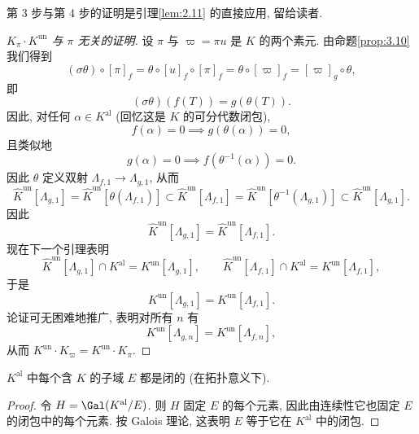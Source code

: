 第 3 步与第 4 步的证明是引理\ref{lem:2.11} 的直接应用, 留给读者.

\begin{proof}[$K_{\pi}\cdot K^{\mathrm{un}}$ 与 $\pi$ 无关的证明]
设 $\pi$ 与 $\varpi=\pi u$ 是 $K$ 的两个素元. 由命题\ref{prop:3.10} 我们得到
\[
(\sigma\theta)\circ[\pi]_f=\theta\circ[u]_f\circ[\pi]_f=\theta\circ[\varpi]_f=[\varpi]_g\circ\theta,
\]
即
\[
(\sigma\theta)(f(T))=g(\theta(T)).
\]
因此, 对任何 $\alpha\in K^{\mathrm{al}}$ (回忆这是 $K$ 的可分代数闭包),
\[
f(\alpha)=0\implies g(\theta(\alpha))=0,
\]
且类似地
\[
g(\alpha)=0\implies f(\theta^{-1}(\alpha))=0.
\]
因此 $\theta$ 定义双射 $\Lambda_{f,1}\to\Lambda_{g,1}$, 从而
\[
\hat{K}^{\mathrm{un}}[\Lambda_{g,1}]=\hat{K}^{\mathrm{un}}[\theta(\Lambda_{f,1})]\subset\hat{K}^{\mathrm{un}}[\Lambda_{f,1}]=\hat{K}^{\mathrm{un}}[\theta^{-1}(\Lambda_{g,1})]\subset\hat{K}^{\mathrm{un}}[\Lambda_{g,1}].
\]
因此
\[
\hat{K}^{\mathrm{un}}[\Lambda_{g,1}]=\hat{K}^{\mathrm{un}}[\Lambda_{f,1}].
\]
现在下一个引理表明
\[
\hat{K}^{\mathrm{un}}[\Lambda_{g,1}]\cap K^{\mathrm{al}}=K^{\mathrm{un}}[\Lambda_{g,1}],\qquad \hat{K}^{\mathrm{un}}[\Lambda_{f,1}]\cap K^{\mathrm{al}}=K^{\mathrm{un}}[\Lambda_{f,1}],
\]
于是
\[
K^{\mathrm{un}}[\Lambda_{g,1}]=K^{\mathrm{un}}[\Lambda_{f,1}].
\]
论证可无困难地推广, 表明对所有 $n$ 有
\[
K^{\mathrm{un}}[\Lambda_{g,n}]=K^{\mathrm{un}}[\Lambda_{f,n}],
\]
从而 $K^{\mathrm{un}}\cdot K_{\varpi}=K^{\mathrm{un}}\cdot K_{\pi}$.
\end{proof}

\begin{lemma}\label{lem:3.12}
$K^{\mathrm{al}}$ 中每个含 $K$ 的子域 $E$ 都是闭的 (在拓扑意义下).
\end{lemma}

\begin{proof}
令 $H=\Gal(K^{\mathrm{al}}/E)$. 则 $H$ 固定 $E$ 的每个元素, 因此由连续性它也固定 $E$ 的闭包中的每个元素. 按 Galois 理论, 这表明 $E$ 等于它在 $K^{\mathrm{al}}$ 中的闭包.
\end{proof}

